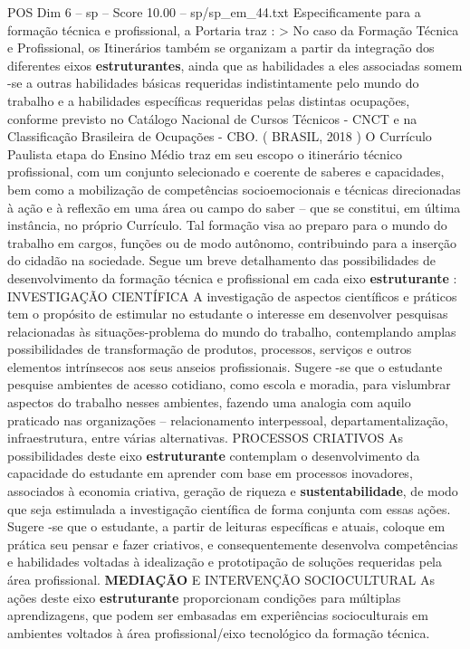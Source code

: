 \begin{textsample}{POS Dim 6 – sp – Score 10.00 – sp/sp\_em\_44.txt}
Especificamente para a formação técnica e profissional, a Portaria traz : > No caso da Formação Técnica e Profissional, os Itinerários também se organizam a partir da integração dos diferentes eixos \textbf{estruturantes}, ainda que as habilidades a eles associadas somem -se a outras habilidades básicas requeridas indistintamente pelo mundo do trabalho e a habilidades específicas requeridas pelas distintas ocupações, conforme previsto no Catálogo Nacional de Cursos Técnicos - CNCT e na Classificação Brasileira de Ocupações - CBO. ( BRASIL, 2018 ) O Currículo Paulista etapa do Ensino Médio traz em seu escopo o itinerário técnico profissional, com um conjunto selecionado e coerente de saberes e capacidades, bem como a mobilização de competências socioemocionais e técnicas direcionadas à ação e à reflexão em uma área ou campo do saber – que se constitui, em última instância, no próprio Currículo.
Tal formação visa ao preparo para o mundo do trabalho em cargos, funções ou de modo autônomo, contribuindo para a inserção do cidadão na sociedade.
Segue um breve detalhamento das possibilidades de desenvolvimento da formação técnica e profissional em cada eixo \textbf{estruturante} : INVESTIGAÇÃO CIENTÍFICA A investigação de aspectos científicos e práticos tem o propósito de estimular no estudante o interesse em desenvolver pesquisas relacionadas às situações-problema do mundo do trabalho, contemplando amplas possibilidades de transformação de produtos, processos, serviços e outros elementos intrínsecos aos seus anseios profissionais.
Sugere -se que o estudante pesquise ambientes de acesso cotidiano, como escola e moradia, para vislumbrar aspectos do trabalho nesses ambientes, fazendo uma analogia com aquilo praticado nas organizações – relacionamento interpessoal, departamentalização, infraestrutura, entre várias alternativas.
PROCESSOS CRIATIVOS As possibilidades deste eixo \textbf{estruturante} contemplam o desenvolvimento da capacidade do estudante em aprender com base em processos inovadores, associados à economia criativa, geração de riqueza e \textbf{sustentabilidade}, de modo que seja estimulada a investigação científica de forma conjunta com essas ações.
Sugere -se que o estudante, a partir de leituras específicas e atuais, coloque em prática seu pensar e fazer criativos, e consequentemente desenvolva competências e habilidades voltadas à idealização e prototipação de soluções requeridas pela área profissional. \textbf{MEDIAÇÃO} E INTERVENÇÃO SOCIOCULTURAL As ações deste eixo \textbf{estruturante} proporcionam condições para múltiplas aprendizagens, que podem ser embasadas em experiências socioculturais em ambientes voltados à área profissional/eixo tecnológico da formação técnica.

\end{textsample}
